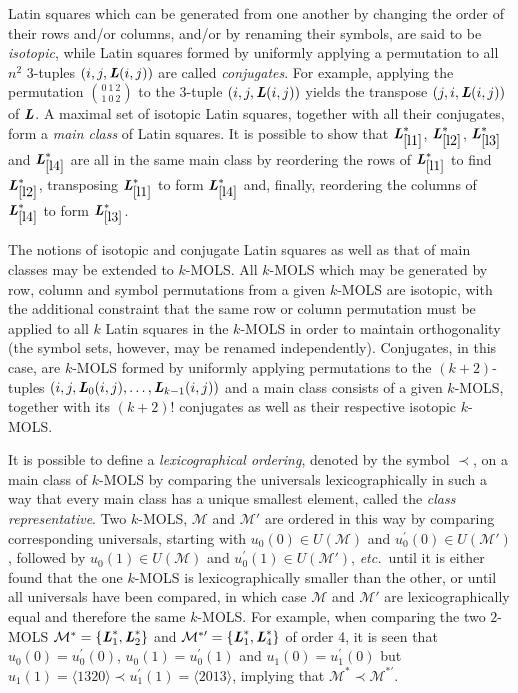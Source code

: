 \documentclass[11pt, a4paper]{article}
\newcommand{\lat}{Latin square}
\renewcommand{\l}{ \mbox{\bf \emph{L}} }
\newcommand{\m}{\mathcal{ M}}
\newcommand{\lref}[1]{$\l_{\ref{#1}}^*$}
\newcounter{ls}
\begin{document}
\lat s which can be generated from one another by changing the order of their rows and/or columns, and/or by renaming their symbols, are said to be \emph{isotopic},  while \lat s formed by uniformly applying a permutation to all $n^2$ $3$-tuples $(i,j, \l(i,j))$ are called \emph{conjugates}. For example, applying the permutation $\binom{0 \ 1 \ 2}{1\ 0\ 2}$ to the $3$-tuple $(i,j, \l(i,j))$ yields the transpose $(j,i, \l(i,j))$ of $\l$. 
A maximal  set of isotopic \lat s, together with all their conjugates, form a \emph{main class} of \lat s.  It is possible to show that \lref{l1}, \lref{l2}, \lref{l3} and \lref{l4} are all in the same main class by reordering the rows of \lref{l1} to find \lref{l2}, transposing \lref{l1} to form \lref{l4} and,  finally, reordering the columns of \lref{l4} to form \lref{l3}.

The notions of    isotopic and  conjugate \lat s as well as that of main classes may be extended to $k$-MOLS.  All $k$-MOLS which may be generated by row, column and symbol permutations from  a given $k$-MOLS are isotopic, with the additional constraint that the same row or column permutation must be applied to all $k$ \lat s in the  $k$-MOLS in order to maintain orthogonality (the symbol sets, however, may be renamed independently). Conjugates, in this case, are $k$-MOLS formed by uniformly applying permutations to the $(k+2)$-tuples $(i,j, \l_0(i,j), \ldots, \l_{k-1}(i,j))$ and a main class consists of a given $k$-MOLS, together with its $(k+2)!$ conjugates as well as their respective isotopic $k$-MOLS.

It is possible to define a \emph{lexicographical ordering}, denoted by the symbol $\prec$,  on a main class of $k$-MOLS by comparing the universals lexicographically in such a way that every main class has a unique smallest element, called the \emph{class representative}. 
Two $k$-MOLS, $\m$ and $\m'$ are ordered in this way by 
comparing corresponding universals, starting with $u_0{(0)}\in U(\m)$ and ${u}_0^{\prime}{(0)}\in U(\m')$, followed 
by $u_0{(1)} \in U(\m)$ and ${u}_0^{\prime}{(1)}\in U(\m')$, \emph{etc.}\ until 
it is either found that the one $k$-MOLS is lexicographically smaller than the other, or until all universals have been compared, in which case $\m$ and $\m'$ are lexicographically equal and therefore the same $k$-MOLS. For example, when comparing the two $2$-MOLS $\m^*=\{\l_1^*, \l_2^*\}$ and $\m^{*\prime}=\{\l_1^*, \l_4^*\}$ of order 4, it is seen that $u_0{(0)} ={u}_0^{\prime}{(0)}$,  $u_0{(1)} ={u}_0^{\prime}{(1)}$ and $u_1{(0)} ={u}_1^{\prime}{(0)}$ but  $u_1{(1)} = \langle 1320\rangle \prec {u}_1^{\prime}{(1)} =\langle 2013\rangle$, implying that $\m^* \prec \m^{*\prime}$.
\end{document}
